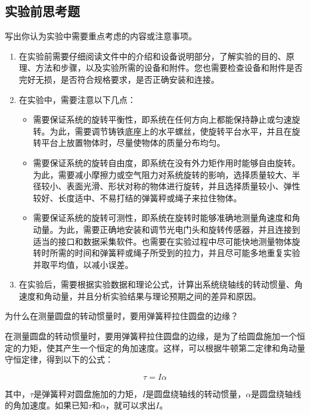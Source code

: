 \documentclass[dvipsnames, svgnames,a4paper,11pt]{article}
\begin{document}
	\subsection{实验前思考题}
	\begin{question}
		写出你认为实验中需要重点考虑的内容或注意事项。
	\end{question}
	\begin{enumerate}
		\item 在实验前需要仔细阅读文件中的介绍和设备说明部分，了解实验的目的、原理、方法和步骤，以及实验所需的设备和附件。您也需要检查设备和附件是否完好无损，是否符合规格要求，是否正确安装和连接。
		
		\item 在实验中，需要注意以下几点：
		\begin{itemize}
			\item 需要保证系统的旋转平衡性，即系统在任何方向上都能保持静止或匀速旋转。为此，需要调节铸铁底座上的水平螺丝，使旋转平台水平，并且在旋转平台上放置物体时，尽量使物体的质量分布均匀。
			
			\item 需要保证系统的旋转自由度，即系统在没有外力矩作用时能够自由旋转。为此，需要减小摩擦力或空气阻力对系统旋转的影响，选择质量较大、半径较小、表面光滑、形状对称的物体进行旋转，并且选择质量较小、弹性较好、长度适中、不易打结的弹簧秤或绳子来拉住物体。
			
			\item 需要保证系统的旋转可测性，即系统在旋转时能够准确地测量角速度和角动量。为此，需要正确地安装和调节光电门头和旋转传感器，并且连接到适当的接口和数据采集软件。也需要在实验过程中尽可能快地测量物体旋转时所需的时间和弹簧秤或绳子所受到的拉力，并且尽可能多地重复实验并取平均值，以减小误差。
		\end{itemize}
		
		\item 在实验后，需要根据实验数据和理论公式，计算出系统绕轴线的转动惯量、角速度和角动量，并且分析实验结果与理论预期之间的差异和原因。
	\end{enumerate}
	
	\begin{question}
		为什么在测量圆盘的转动惯量时，要用弹簧秤拉住圆盘的边缘？
	\end{question}
	在测量圆盘的转动惯量时，要用弹簧秤拉住圆盘的边缘，是为了给圆盘施加一个恒定的力矩，使其产生一个恒定的角加速度。这样，可以根据牛顿第二定律和角动量守恒定律，得到以下的公式：
	
	\[
	\tau = I\alpha
	\]
	
	其中，$\tau$是弹簧秤对圆盘施加的力矩，$I$是圆盘绕轴线的转动惯量，$\alpha$是圆盘绕轴线的角加速度。如果已知$\tau$和$\alpha$，就可以求出$I$。
	
\end{document}
